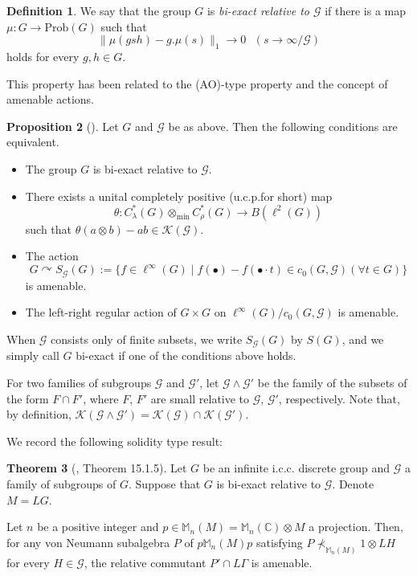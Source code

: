 \documentclass{amsart}
\theoremstyle{definition}
\newtheorem{theorem}{Theorem}[section]
\newtheorem{proposition}[theorem]{Proposition}
\newtheorem{definition}[theorem]{Definition}
\newcommand{\Mat}{\mathbb{M}}
\newcommand{\C}{\mathbb{C}}
\newcommand{\mintensor}{\otimes_{\mathrm{min}}}
\begin{document}
\begin{definition}
We say that the group $G$ is \emph{bi-exact relative to $\mathcal{G}$} if there is a map $\mu : G\to \mathrm{Prob}(G)$ such that 
\[
\| \mu (gsh) - g.\mu(s) \|_1 \to 0 \text{ }(s\to \infty / \mathcal{G})
\]
holds for every $g,h\in G$. 
\end{definition}

This property has been related to the (AO)-type property and the concept of amenable actions. 

\begin{proposition}[\textup{\cite[Proposition 15.1.4, 15.2.3]{bo}}]
Let $G$ and $\mathcal{G}$ be as above. Then the following
conditions are equivalent.  
\begin{itemize}
\item The group $G$ is bi-exact relative to $\mathcal{G}$. 
\item There exists a unital completely positive (u.c.p.\@ for short) map 
\[
\theta : C^{\ast}_{\lambda}(G) \mintensor C^{\ast}_{\rho}(G) 
\to B(\ell^2(G))
\]
such that $\theta(a\otimes b)-ab \in \mathcal{K}(\mathcal{G})$. 
\item The action 
\[
G\curvearrowright S_{\mathcal{G}}(G):=\{ f\in \ell^{\infty}(G)\mid f(\bullet)-f(\bullet \cdotp t)\in c_0(G, \mathcal{G}) (\forall t\in G)\}
\] is amenable. 
\item The left-right regular action of $G\times G$ on $\ell^{\infty}(G)/c_0(G,\mathcal{G})$ is amenable. 
\end{itemize} 
\end{proposition}

When $\mathcal{G}$ consists only of finite subsets, 
we write $S_{\mathcal{G}}(G)$ by $S(G)$, 
and we simply call $G$ bi-exact if one of the conditions above holds. 

For two families of subgroups $\mathcal{G}$ and $\mathcal{G}'$, 
let $\mathcal{G}\wedge \mathcal{G}'$ be the family of the subsets of the form $F\cap F'$, 
where $F$, $F'$ are small relative to $\mathcal{G}$, $\mathcal{G}'$, respectively.  
Note that, by definition, 
$\mathcal{K}(\mathcal{G}\wedge\mathcal{G}')=\mathcal{K}(\mathcal{G})\cap\mathcal{K}(\mathcal{G}')$. 

We record the following solidity type result:

\begin{theorem}[\cite{bo}, Theorem 15.1.5]
Let $G$ be an infinite i.c.c. discrete group and 
$\mathcal{G}$ a family of subgroups of $G$. 
Suppose that $G$ is bi-exact relative to $\mathcal{G}$. 
Denote $M=LG$. 

Let $n$ be a positive integer and $p\in\Mat_n (M)=\Mat_n(\C)\otimes M$ a projection. 
Then, for any von Neumann subalgebra $P$ of $p\Mat_n(M)p$ satisfying
$P\nprec_{\Mat_n(M)} 1\otimes LH$ for every $H\in \mathcal{G}$, the relative commutant 
$P'\cap L\Gamma$ is amenable. 
\end{theorem}
\end{document}
